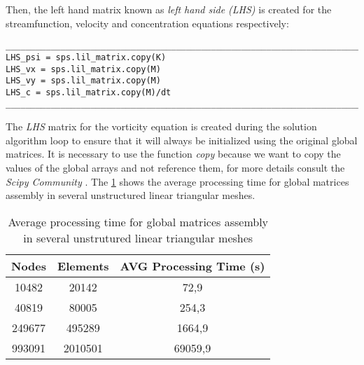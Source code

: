 \newpage
Then, the left hand matrix known as \textit {left hand side (LHS)} 
is created for the streamfunction, velocity and concentration equations 
respectively:

\begin{verbatim}
__________________________________________________________________________
LHS_psi = sps.lil_matrix.copy(K)
LHS_vx = sps.lil_matrix.copy(M)
LHS_vy = sps.lil_matrix.copy(M)
LHS_c = sps.lil_matrix.copy(M)/dt
__________________________________________________________________________
\end{verbatim}

The \textit{LHS} matrix for the vorticity equation is created 
during the solution algorithm loop to ensure that it will always 
be initialized using the original global matrices. 
It is necessary to use the function \textit{copy} because 
we want to copy the values of the global arrays and not reference them, 
for more details consult the \textit{Scipy Community} \cite{numpycopy}. 
The \ref{tempo matrizes globais} shows the average processing time 
for global matrices assembly in several unstructured linear 
triangular meshes.


\vspace{0.5cm}
\begin{table}[H]
\centering
\begin{tabular}{ccc}
\toprule
\textbf{Nodes} & \textbf{Elements} & \textbf{AVG Processing Time} (s) \\
\midrule
10482 & 20142 & 72,9 \\
40819 & 80005 & 254,3 \\
249677 & 495289 & 1664,9 \\
993091 & 2010501 & 69059,9 \\

\bottomrule
\end{tabular}
\caption{Average processing time for global matrices assembly in several unstrutured linear triangular meshes}
\label{tempo matrizes globais}
\end{table}
                
